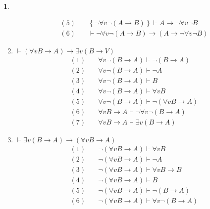 \documentclass[a4paper, 12pt]{ctexbook} %
\theoremstyle{plain}
\theoremstyle{definition}
\newtheorem{problem}{}
\theoremstyle{remark}
\begin{document}
\begin{problem}
\begin{enumerate}
\begin{align*}
    (5)\quad & \left\{ \neg \forall  v \neg \left(A \to B  \right) \right\} \vdash A \to \neg \forall  v \neg B \tag{演绎}\\ 
    (6)\quad & \vdash \neg \forall  v \neg  \left(A \to B \right) \to \left(A \to \neg \forall  v \neg B\right)\tag{演绎}
\end{align*}
\item $\vdash  \left(\forall  v B \to A \right) \to \exists v \left( B \to V\right)$ 
\begin{align*}
(1)\quad & \forall v \neg \left(B \to A \right) \vdash \neg  \left(B \to A \right) \tag{去全称} \\ 
(2)\quad & \forall  v \neg \left( B \to A  \right) \vdash  \neg A \tag{(1)} \\ 
(3)\quad & \forall  v \neg \left( B \to A \right) \vdash B \tag{(1)} \\
(4)\quad & \forall  v \neg \left( B \to A  \right) \vdash \forall v B \tag{全称推广} \\
(5)\quad & \forall  v \neg \left( B\to A \right) \vdash  \neg \left(\forall  v B \to  A     \right) \tag{(2) (4)} \\
(6)\quad & \forall  v B \to A  \vdash \neg \forall  v \neg \left(B \to A \right)\tag{逆否}\\ 
(7)\quad & \forall  v B \to A \vdash \exists v  \left(B \to A \right) 
\end{align*}
\item $\vdash \exists v \left( B \to A \right) \to \left(\forall  v B \to A \right) $ 
\begin{align*}
(1)&\quad      \neg \left(\forall  v B \to A \right) \vdash  \forall  v B \tag{定理}\\
(2)&\quad      \neg \left(\forall  v B \to A  \right) \vdash \neg A \tag{定理} \\
(3)&\quad      \neg \left(\forall  v B \to A  \right) \vdash  \forall v B \to B \tag{去全称} \\
(4)&\quad  \neg \left(\forall  v B \to A  \right) \vdash  B \tag{(1)(3)rmp} \\
(5)&\quad  \neg \left(\forall  v B \to A  \right) \vdash  \neg \left(B \to A \right) \tag{(2)(4)定理} \\ 
(6)&\quad  \neg \left(\forall  v B \to A  \right) \vdash  \forall  v \neg \left(B \to A \right) \tag{全称推广} 
\end{align*}
\end{enumerate}
\end{problem}
\end{document}
